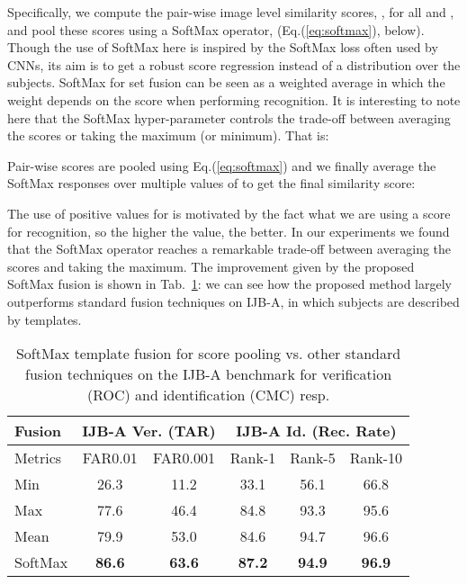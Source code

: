 \documentclass[runningheads]{llncs}
\begin{document}
Specifically, we compute the pair-wise image level similarity scores, , for all  and , and pool these scores using a SoftMax operator,  (Eq.(\ref{eq:softmax}), below). Though the use of SoftMax here is inspired by the SoftMax loss often used by CNNs, its aim is to get a robust score regression instead of a distribution over the subjects. SoftMax for set fusion can be seen as a weighted average in which the weight depends on the score when performing recognition. It is interesting to note here that the SoftMax hyper-parameter  controls the trade-off between averaging the scores or taking the maximum (or minimum). That is:

Pair-wise scores are pooled using Eq.(\ref{eq:softmax}) and we finally average the SoftMax responses over multiple values of  to get the final similarity score:

The use of positive values for  is motivated by the fact what we are using a score for recognition, so the higher the value, the better. In our experiments we found that the SoftMax operator reaches a remarkable trade-off between averaging the scores and taking the maximum. The improvement given by the proposed SoftMax fusion is shown in Tab.~\ref{tab:softmax}: we can see how the proposed method largely outperforms standard fusion techniques on IJB-A, in which subjects are described by templates.


\begin{table}

\centering

\begin{tabular}{l||c|c||c|c|c}

\toprule

\textbf{Fusion} &  \multicolumn{2}{c||}{\textbf{IJB-A Ver. (TAR)}} & \multicolumn{3}{c}{\textbf{IJB-A Id. (Rec. Rate)}}  \\ \hline 
 
 Metrics  & FAR0.01& FAR0.001& Rank-1  & Rank-5  & Rank-10 \\ \hline 

Min   & 26.3 & 11.2 & 33.1 & 56.1 & 66.8  \\ 

Max & 77.6  & 46.4 & 84.8 & 93.3 & 95.6  \\  

Mean & 79.9 & 53.0 & 84.6 &94.7 & 96.6  \\ \hline 
SoftMax & \textbf{86.6} & \textbf{63.6} & \textbf{87.2} & \textbf{94.9} & \textbf{96.9}  \\ 

\bottomrule

\end{tabular}


\vspace{-1mm}
\caption{SoftMax template fusion for score pooling vs. other standard fusion techniques on the IJB-A benchmark for verification (ROC) and identification (CMC) resp.}
\label{tab:softmax}
\vspace{-4mm}
\end{table}
\end{document}

